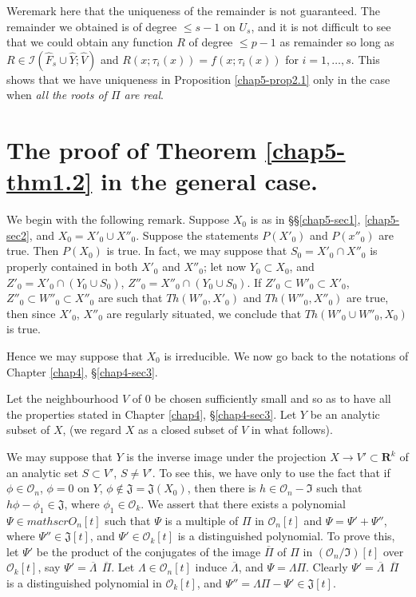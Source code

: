 \begin{remark*}
We\pageoriginale remark here that the uniqueness of the remainder is not guaranteed. The remainder we obtained is of degree $\leq s -1 $ on $U_s$, and it is not difficult to see that we could obtain any function $R$ of degree $\leq p - 1$ as remainder so long as $R \in \mathscr{I}(\widehat{F}_s \cup \widehat{Y}; \widehat{V})$ and $R (x; \tau_i (x)) = f(x ; \tau_i (x))$ for $i =1, \ldots, s$. This shows that we have uniqueness in Proposition \ref{chap5-prop2.1} only in the case when \textit{all the roots of $\Pi$ are real}.
\end{remark*}

\section[The proof of Theorem \ref{chap5-thm1.2} in the  general case]{The proof of Theorem \ref{chap5-thm1.2} in the  general case.}\label{chap5-sec3}
We begin with the following remark. Suppose $X_0$ is as in \S\S \ref{chap5-sec1}, \ref{chap5-sec2}, and $X_0 = X'_0 \cup X''_0$. Suppose the statements $P(X'_0)$ and $P(x''_0)$ are true. Then $P(X_0)$ is true. In fact, we may suppose that $S_0 = X'_0 \cap X''_0 $ is properly contained in both $X'_0$ and $X''_0$; let now $Y_0 \subset X_0$, and $Z'_0 = X'_0 \cap (Y_0 \cup S_0)$, $Z''_0 = X''_0 \cap (Y_0 \cup S_0)$. If $Z'_0 \subset W'_0 \subset X'_0$, $Z''_0 \subset W''_0 \subset X''_0$ are such that $Th(W'_0, X'_0)$ and $Th (W''_0, X''_0)$ are true, then since $X'_0$, $X''_0$ are regularly situated, we conclude that $Th (W'_0 \cup W''_0 , X_0)$ is true.

Hence we may suppose that $X_0$ is irreducible. We now go back to the notations of Chapter \ref{chap4}, \S \ref{chap4-sec3}.

Let the neighbourhood $V$ of 0 be chosen sufficiently small and so as to have all the properties stated in Chapter \ref{chap4}, \S \ref{chap4-sec3}. Let $Y$ be an analytic subset of $X$, (we regard $X$ as a closed subset of $V$ in what follows).

We may suppose that $Y$ is the inverse image under the projection $X \to V' \subset \mathbf{R}^k$ of an analytic set $S \subset V'$, $S \neq V'$. To see this, we have only to use the fact that if $\phi \in \mathscr{O}_n$, $\phi = 0$ on $Y$, $\phi \not\in \mathfrak{J} = \mathfrak{J} (X_0)$, then there is $h \in \mathscr{O}_n-  \mathfrak{I}$ such that $h \phi - \phi_1 \in \mathfrak{J}$, where $\phi_1 \in \mathscr{O}_k$. We assert that there exists a polynomial $\Psi \in mathscr{O}_n[t]$ such that $\Psi$ is a multiple of $\Pi$ in $\mathscr{O}_n[t]$ and $\Psi = \Psi' + \Psi''$, where $\Psi'' \in \mathfrak{J}[t]$, and $\Psi' \in \mathscr{O}_k [t]$ is a distinguished polynomial. To prove this, let $\Psi'$ be the product of the conjugates of the image $\overline{\Pi}$ of $\Pi$ in $(\mathscr{O}_n/\mathfrak{I})[t]$ over $\mathscr{O}_k[t]$, say $\Psi' = \overline{\Lambda}~~ \overline{\Pi}$. Let $\Lambda \in \mathscr{O}_n[t]$ induce $\overline{\Lambda}$, and $\Psi = \Lambda \Pi$. Clearly $\Psi' = \overline{\Lambda}~~ \overline{\Pi}$ is a distinguished polynomial in $\mathscr{O}_k [t]$, and $\Psi'' = \Lambda \Pi - \Psi' \in \mathfrak{J}[t]$.

